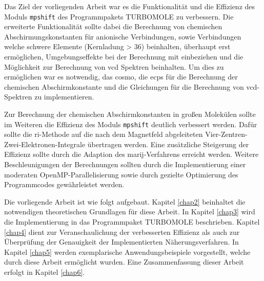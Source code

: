 Das Ziel der vorliegenden Arbeit war es die Funktionalität und die Effizienz des Moduls \texttt{mpshift} des Programmpakets \textsc{TURBOMOLE}\supercite{TURBOMOLE,grimme2010consistent,born1927quantentheorie} zu verbessern. Die erweiterte Funktionalität sollte dabei die Berechnung von chemischen Abschirmungskonstanten für anionische Verbindungen, sowie Verbindungen welche schwere Elemente (Kernladung > 36) beinhalten, überhaupt erst ermöglichen, Umgebungseffekte bei der Berechnung mit einbeziehen und die Möglichkeit zur Berechnung von \ac{vcd} Spektren beinhalten. Um dies zu ermöglichen war es notwendig, das \ac{cosmo}, die \acp{ecp} für die Berechnung der chemischen Abschirmkonstante und die Gleichungen für die Berechnung von \ac{vcd}-Spektren zu implementieren. 

Zur Berechnung der chemischen Abschirmkonstanten in großen Molekülen sollte im Weiteren die Effizienz des Moduls \texttt{mpshift} deutlich verbessert werden. Dafür sollte die \ac{ri}-Methode auf die nach dem Magnetfeld abgeleiteten Vier-Zentren-Zwei-Elektronen-Integrale übertragen werden. Eine zusätzliche Steigerung der Effizienz sollte durch die Adaption des \ac{marij}-Verfahrens erreicht werden. Weitere Beschleunigungen der Berechnungen sollten durch die Implementierung einer moderaten OpenMP-Parallelisierung sowie durch gezielte Optimierung des Programmcodes gewährleistet werden. 

\bigskip
Die vorliegende Arbeit ist wie folgt aufgebaut. Kapitel \ref{chap2} beinhaltet die notwendigen theoretischen Grundlagen für diese Arbeit. In Kapitel \ref{chap3} wird die Implementierung in das Programmpaket \textsc{TURBOMOLE} beschrieben. Kapitel \ref{chap4} dient zur Veranschaulichung der verbesserten Effizienz als auch zur Überprüfung der Genauigkeit der Implementierten Näherungsverfahren. In Kapitel \ref{chap5} werden exemplarische Anwendungsbeispiele vorgestellt, welche durch diese Arbeit ermöglicht wurden. Eine Zusammenfassung dieser Arbeit erfolgt in Kapitel \ref{chap6}.